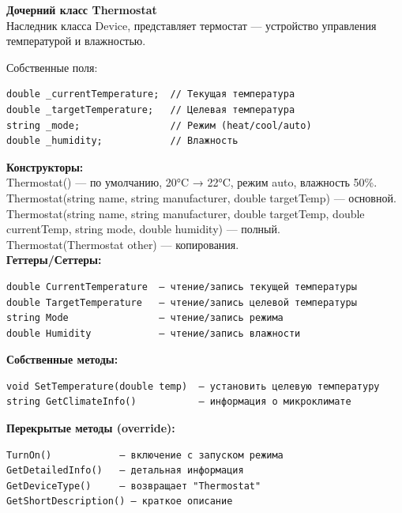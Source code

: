 \documentclass[oneside,a4paper,14pt]{extarticle}
\begin{document}
\textbf{Дочерний класс Thermostat}\\

Наследник класса Device, представляет термостат — устройство управления температурой и влажностью.

Собственные поля:

\begin{verbatim}
double _currentTemperature;  // Текущая температура
double _targetTemperature;   // Целевая температура
string _mode;                // Режим (heat/cool/auto)
double _humidity;            // Влажность
\end{verbatim}

\textbf{Конструкторы:}\\

Thermostat() — по умолчанию, 20°C → 22°C, режим auto, влажность 50\%.\\

Thermostat(string name, string manufacturer, double targetTemp) — основной.\\

Thermostat(string name, string manufacturer, double targetTemp, double currentTemp, string mode, double humidity) — полный.\\

Thermostat(Thermostat other) — копирования.\\

\textbf{Геттеры/Сеттеры:}

\begin{verbatim}
double CurrentTemperature  — чтение/запись текущей температуры
double TargetTemperature   — чтение/запись целевой температуры
string Mode                — чтение/запись режима
double Humidity            — чтение/запись влажности
\end{verbatim}

\textbf{Собственные методы:}

\begin{verbatim}
void SetTemperature(double temp)  — установить целевую температуру
string GetClimateInfo()           — информация о микроклимате
\end{verbatim}

\textbf{Перекрытые методы (override):}

\begin{verbatim}
TurnOn()            — включение с запуском режима
GetDetailedInfo()   — детальная информация
GetDeviceType()     — возвращает "Thermostat"
GetShortDescription() — краткое описание
\end{verbatim}
\end{document}
